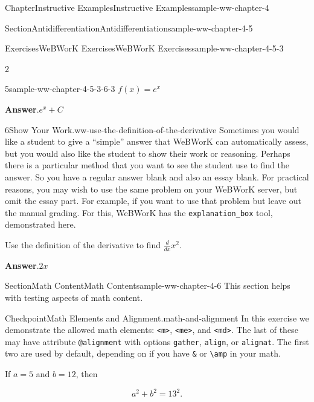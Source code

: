 \documentclass[oneside,10pt,]{book}
\newcommand{\blocktitlefont}{\relax}
\newcommand{\mono}[1]{\texttt{#1}}
\numberwithin{equation}{section}
\begin{document}
\begin{chapterptx}{Chapter}{Instructive Examples}{}{Instructive Examples}{}{}{sample-ww-chapter-4}
\begin{sectionptx}{Section}{Antidifferentiation}{}{Antidifferentiation}{}{}{sample-ww-chapter-4-5}
\begin{exercises-subsection}{Exercises}{WeBWorK Exercises}{}{WeBWorK Exercises}{}{}{sample-ww-chapter-4-5-3}
\begin{exercisegroupcol}{2}
\begin{divisionexerciseegcol}{5}{}{}{sample-ww-chapter-4-5-3-6-3}
\(f(x)=e^x\)%
\par\smallskip%
\noindent\textbf{\blocktitlefont Answer}.\hypertarget{sample-ww-chapter-4-5-3-6-3-2}{}\quad{}\(e^{x}+C\)%
\end{divisionexerciseegcol}%
\end{exercisegroupcol}
\par\medskip\noindent
\begin{divisionexercise}{6}{Show Your Work.}{}{ww-use-the-definition-of-the-derivative}%
Sometimes you would like a student to give a ``simple'' answer that WeBWorK can automatically assess, but you would also like the student to show their work or reasoning. Perhaps there is a particular method that you want to see the student use to find the answer. So you have a regular answer blank and also an essay blank. For practical reasons, you may wish to use the same problem on your WeBWorK server, but omit the essay part. For example, if you want to use that problem but leave out the manual grading. For this, WeBWorK has the \mono{explanation\_box} tool, demonstrated here.%
\par
Use the definition of the derivative to find \(\frac{d}{dx}x^2\text{.}\)%
\par\smallskip%
\noindent\textbf{\blocktitlefont Answer}.\hypertarget{ww-use-the-definition-of-the-derivative-3}{}\quad{}\(2x\)%
\end{divisionexercise}%
\end{exercises-subsection}
\end{sectionptx}
%
%
\typeout{************************************************}
\typeout{************************************************}
%
\begin{sectionptx}{Section}{Math Content}{}{Math Content}{}{}{sample-ww-chapter-4-6}
This section helps with testing aspects of math content.%
\begin{inlineexercise}{Checkpoint}{Math Elements and Alignment.}{math-and-alignment}%
In this exercise we demonstrate the allowed math elements: \mono{<m>}, \mono{<me>}, and \mono{<md>}. The last of these may have attribute \mono{@alignment} with options \mono{gather}, \mono{align}, or \mono{alignat}. The first two are used by default, depending on if you have \mono{\&} or \mono{\textbackslash{}amp} in your math.%
\par
If \(a=5\) and \(b=12\text{,}\) then%
\par
%
\begin{equation*}
a^2+b^2=13^2\text{.}
\end{equation*}

\end{inlineexercise}
\end{sectionptx}
\end{chapterptx}
\end{document}
